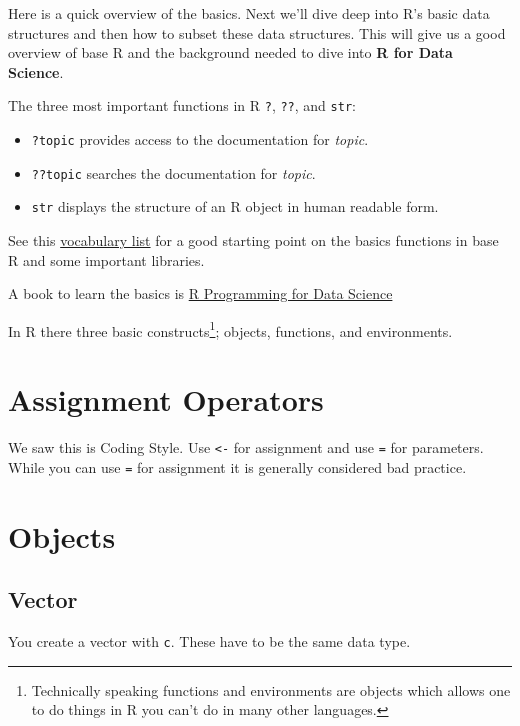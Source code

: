 \documentclass[]{book}
\providecommand{\tightlist}{%
  \setlength{\itemsep}{0pt}\setlength{\parskip}{0pt}}
\let\rmarkdownfootnote\footnote%
\def\footnote{\protect\rmarkdownfootnote}
\theoremstyle{definition}
\theoremstyle{definition}
\theoremstyle{definition}
\theoremstyle{remark}
\begin{document}
Here is a quick overview of the basics. Next we'll dive deep into R's
basic data structures and then how to subset these data structures. This
will give us a good overview of base R and the background needed to dive
into \textbf{R for Data Science}.

The three most important functions in R \texttt{?}, \texttt{??}, and
\texttt{str}:

\begin{itemize}
\tightlist
\item
  \texttt{?topic} provides access to the documentation for \emph{topic}.
\item
  \texttt{??topic} searches the documentation for \emph{topic}.
\item
  \texttt{str} displays the structure of an R object in human readable
  form.
\end{itemize}

See this \href{http://adv-r.had.co.nz/Vocabulary.html}{vocabulary list}
for a good starting point on the basics functions in base R and some
important libraries.

A book to learn the basics is
\href{https://bookdown.org/rdpeng/rprogdatascience/}{R Programming for
Data Science}

In R there three basic constructs\footnote{Technically speaking
  functions and environments are objects which allows one to do things
  in R you can't do in many other languages.}; objects, functions, and
environments.

\section{Assignment Operators}\label{assignment-operators}

We saw this is Coding Style. Use \texttt{\textless{}-} for assignment
and use \texttt{=} for parameters. While you can use \texttt{=} for
assignment it is generally considered bad practice.

\section{Objects}\label{objects}

\subsection{Vector}\label{vector}

You create a vector with \texttt{c}. These have to be the same data
type.
\end{document}
